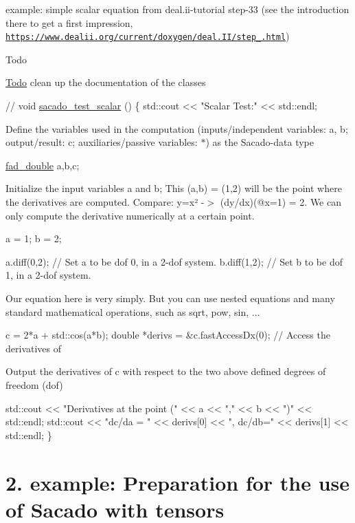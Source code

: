 \begin{DoxyEnumerate}
\item example\+: simple scalar equation from deal.\+ii-\/tutorial step-\/33 (see the introduction there to get a first impression, \href{https://www.dealii.org/current/doxygen/deal.II/step_33.html}{\tt https\+://www.\+dealii.\+org/current/doxygen/deal.\+I\+I/step\+\_.\+html}) \begin{DoxyRefDesc}{Todo}
\item[\hyperlink{todo__todo000004}{Todo}]clean up the documentation of the classes \end{DoxyRefDesc}

\begin{DoxyCode}
\textcolor{comment}{//}
\textcolor{keywordtype}{void} \hyperlink{Sacado__example_8cc_a71b2675e62203edc430e7ffc8a365193}{sacado\_test\_scalar} ()
\{
    std::cout << \textcolor{stringliteral}{"Scalar Test:"} << std::endl;
\end{DoxyCode}
 Define the variables used in the computation (inputs/independent variables\+: a, b; output/result\+: c; auxiliaries/passive variables\+: $\ast$) as the Sacado-\/data type 
\begin{DoxyCode}
\hyperlink{Sacado-auxiliary__functions_8h_a868b94676739e612d9c95940e70892a9}{fad\_double} a,b,c;
\end{DoxyCode}
 Initialize the input variables a and b; This (a,b) = (1,2) will be the point where the derivatives are computed. Compare\+: y=x² -\/$>$ (dy/dx)(@x=1) = 2. We can only compute the derivative numerically at a certain point. 
\begin{DoxyCode}
 a = 1;
 b = 2;

a.diff(0,2);  \textcolor{comment}{// Set a to be dof 0, in a 2-dof system.}
b.diff(1,2);  \textcolor{comment}{// Set b to be dof 1, in a 2-dof system.}
\end{DoxyCode}
 Our equation here is very simply. But you can use nested equations and many standard mathematical operations, such as sqrt, pow, sin, ... 
\begin{DoxyCode}
c = 2*a + std::cos(a*b);
\textcolor{keywordtype}{double} *derivs = &c.fastAccessDx(0); \textcolor{comment}{// Access the derivatives of}
\end{DoxyCode}
 Output the derivatives of c with respect to the two above defined degrees of freedom (dof) 
\begin{DoxyCode}
    std::cout << \textcolor{stringliteral}{"Derivatives at the point ("} << a << \textcolor{stringliteral}{","} << b << \textcolor{stringliteral}{")"} << std::endl;
    std::cout << \textcolor{stringliteral}{"dc/da = "} << derivs[0] << \textcolor{stringliteral}{", dc/db="} << derivs[1] << std::endl;
\}
\end{DoxyCode}
 
\end{DoxyEnumerate}\hypertarget{index_Ex2}{}\section{2. example\+: Preparation for the use of Sacado with tensors}\label{index_Ex2}
